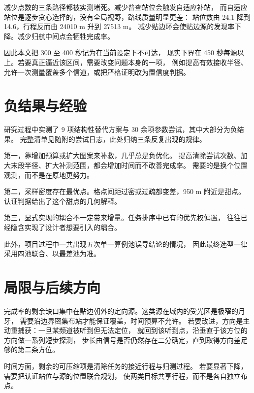 减少点数的三条路径都被实测堵死。减少普查站位会触发自适应补站，
而自适应站位是逐步贪心选择的，没有全局视野，路线质量明显更差：
站位数由 24.1 降到 14.6，行程反而由 24010 m 升到 27513 m。
减少贴边环会使贴边源的发现率下降。减少归航中间点会牺牲完成率。

因此本文把 300 至 400 秒记为在当前设定下不可达，
现实下界在 450 秒每源以上。若要真正逼近该区间，需要改变问题本身的一项，
例如提高有效接收半径、允许一次测量覆盖多个信道，或把严格证明改为置信度判据。

\section{负结果与经验}

研究过程中实测了 9 项结构性替代方案与 30 余项参数尝试，其中大部分为负结果。
完整清单见随附的尝试日志，此处归纳三条反复出现的规律。

第一，靠增加预算或扩大图案来补救，几乎总是负优化。
提高清除尝试次数、加大末段半径、扩大补测范围，都会增加时间而不改善完成率。
需要的是换个位置观测，而不是在原地更努力。

第二，采样密度存在最优点。格点间距过密或过疏都变差，950 m 附近是甜点。
认证判据给出了这个甜点的几何解释。

第三，显式实现的耦合不一定带来增量。任务排序中已有的优先权偏置，
往往已经隐含实现了设计者想要引入的耦合。

此外，项目过程中一共出现五次单一算例池误导结论的情况，
因此最终选型一律采用四池联合、以最差池为准。

\section{局限与后续方向}

完成率的剩余缺口集中在贴边朝外的定向源。这类源在域内的受光区是极窄的月牙，
需要沿边界密集布站才能保证覆盖，时间预算不允许。
若要改进，方向是主动重捕获：一旦某频道被听到但无法定位，
就回到该听到点，沿垂直于该方位的方向做一系列短步探测，
步长由信号是否仍然存在二分确定，直到取得方向差足够的第二条方位。

时间方面，剩余的可压缩项是清除任务的接近行程与归测过程。
若要显著下降，需要把认证站位与源的位置联合规划，
使两类目标共享行程，而不是各自独立布点。


